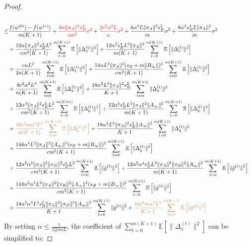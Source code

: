 \documentclass{article}
\newcommand{\EE}[1]{\mathbb{E}\left[#1\right]}
\newcommand{\norm}[1]{\| #1 \|}
\begin{document}
\begin{proof}
\begin{align*}
  \\\leq& \frac{f(w^{(0)})-f(w^{(*)})}{m(K+1)}+\textcolor{red}{\frac{8\alpha \norm{\pi_A}^2s_B^4}{cm^2}\sigma^2}+\textcolor{red}{ \frac{2c^2\alpha^2L}{n}\sigma^2}+\frac{6\alpha^2L\norm{\pi_A}^2s_B^2}{m}\sigma^2+\frac{8\alpha^2s_B^4L\norm{\pi_A}^2}{m}\sigma^2\\&+\frac{12\alpha \norm{\pi_A}^2s_B^4L^2}{cm^2(K+1)}\sum_{t=0}^{m(K+1)}\EE{\norm{\Delta_x^{(t)}}^2}+\frac{12\alpha^2s_B^4L^3\norm{\pi_A}^2}{m(K+1)}\sum_{t=0}^{m(K+1)}\EE{\norm{\Delta_x^{(t)}}^2}\\&+\frac{c\alpha L^2}{2n(K+1)}\sum_{t=0}^{m(K+1)}\EE{\norm{\Delta_x^{(t)}}^2}+\frac{54\alpha L^2\norm{\pi_A}^2(s_B+m\norm{B_{\infty}})^2}{cm^2(K+1)}\sum_{t=0}^{m(K+1)}\EE{\norm{\Delta_x^{(t)}}^2}\\&+\frac{8c^2\alpha^2L^3}{n(K+1)}\sum_{t=0}^{m(K+1)}\EE{\norm{\Delta_x^{(t)}}^2}+\frac{18\alpha^2L^3\norm{\pi_A}^2s_B^2}{ K+1}\sum_{t=0}^{m(K+1)}\norm{\Delta_x^{(t)}}^2\\&+\frac{12\alpha^3\norm{\pi_A}^2s_B^4L^2}{cm^2(K+1)}\sum_{t=0}^{m(K+1)}\EE{\norm{\Delta_y^{(t)}}^2}+\frac{12\alpha^4s_B^4L^3\norm{\pi_A}^2\norm{A_{\infty}}^2}{m(K+1)}\sum_{t=0}^{m(K+1)}\EE{\norm{\Delta_y^{(t)}}^2}\\&+\textcolor{brown}{\frac{16c^2m\alpha^4L^3}{n(K+1)}\sum_{t=0}^{m(K+1)}\EE{\norm{\Delta_y^{(t)}}^2}}+\frac{18\alpha^4L^3\norm{\pi_A}^2s_B^2\norm{A_{\infty}}^2}{ K+1}\sum_{t=0}^{m(K+1)}\norm{\Delta_y^{(t)}}^2\\&+\frac{144\alpha^3L^2\norm{\pi_A}^2\norm{A_{\infty}}^2(s_B+m\norm{B_{\infty}})^2}{cm^2(K+1)}\sum_{t=0}^{m(K+1)}\EE{\norm{\Delta_y^{(t)}}^2}\\&+\frac{12n^2\alpha^3\norm{\pi_A}^2\norm{\pi_B}^2s_B^4L^2}{cm^2(K+1)}\sum_{t=0}^{m(K+1)}\EE{\norm{\bar{g}^{(t)}}^2}+\frac{12n^2\alpha^4s_B^4L^3\norm{\pi_A}^2\norm{\pi_B}^2\norm{A_{\infty}}^2}{m(K+1)}\sum_{t=0}^{m(K+1)}\EE{\norm{\bar{g}^{(t)}}^2}
    \\&+\frac{144n^2\alpha^3L^2\norm{\pi_A}^2\norm{\pi_B}^2\norm{A_{\infty}}^2(s_B+m\norm{B_{\infty}})^2}{cm^2(K+1)}\sum_{t=0}^{m(K+1)}\EE{\norm{\bar{g}^{(t)}}^2}
    \\&+\frac{18n^2\alpha^4L^3s_B^2\norm{\pi_A}^2\norm{\pi_B}^2\norm{A_{\infty}}^2}{ K+1}\sum_{t=0}^{m(K+1)}\norm{\bar{g}^{(t)}}^2+\textcolor{brown}{\frac{16c^4m\alpha^4L^3}{K+1}\sum_{t=0}^{m(K+1)}\EE{\norm{\bar{g}^{(t)}}^2}}
  \end{align*}
  By setting $\alpha \leq \frac{1}{12cmL}$, the coefficient of $\sum_{t=0}^{m(K+1)}\EE{\norm{\Delta_x^{(t)}}^2}$ can be simplified to:

\end{proof}
\end{document}
